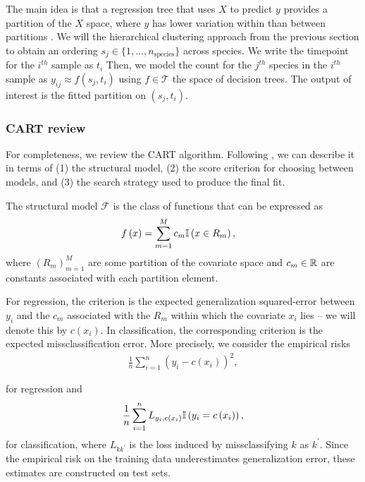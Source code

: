 \documentclass{article}
\begin{document}
The main idea is that a regression tree that uses $X$ to predict $y$ provides a
partition of the $X$ space, where $y$ has lower variation within than between
partitions \citep{breiman1984classification}. We will the hierarchical
clustering approach from the previous section to obtain an ordering $s_{j} \in
\{1, \dots, n_{\text{species}}\}$ across species. We write the timepoint for the
$i^{th}$ sample as $t_{i}$ Then, we model the count for the $j^{th}$ species in
the $i^{th}$ sample as $y_{ij} \approx f\left(s_{j}, t_{i}\right)$ using
$f \in \mathcal{T}$ the space of decision trees. The output of interest is the
fitted partition on $\left(s_{j}, t_{i}\right)$.

\subsubsection{CART review}
\label{subsubsec:cart_review}

For completeness, we review the CART algorithm. Following \citep{stat315bnotes},
we can describe it in terms of (1) the structural model, (2) the score criterion
for choosing between models, and (3) the search strategy used to produce the
final fit.

The structural model $\mathcal{F}$ is the class of functions that can be
expressed as
\begin{align}
f\left(x\right) &= \sum_{m = 1}^{M} c_{m} \mathbb{I}\left({x \in R_{m}}\right),
\end{align}
where $\left(R_{m}\right)_{m = 1}^{M}$ are some partition of the covariate space
and $c_{m} \in \mathbb{R}$ are constants associated with each partition element.

For regression, the criterion is the expected generalization squared-error
between $y_{i}$ and the $c_{m}$ associated with the $R_{m}$ within which the
covariate $x_{i}$ lies -- we will denote this by $c\left(x_{i}\right)$. In
classification, the corresponding criterion is the expected missclassification
error. More precisely, we consider the empirical risks
\begin{align}
  \frac{1}{n} \sum_{i = 1}^{n} \left(y_{i} - c\left(x_{i}\right)\right)^{2},
\end{align}

for regression and
\begin{align}
  \frac{1}{n} \sum_{i = 1}^{n} L_{y_{i}, c\left(x_{i}\right)} \mathbb{I}\left({y_{i} = c\left(x_{i}\right)}\right),
\end{align}
for classification, where $L_{kk^{\prime}}$ is the loss induced by
missclassifying $k$ as $k^{\prime}$. Since the empirical risk on the training
data underestimates generalization error, these estimates are constructed on
test sets.
\end{document}
